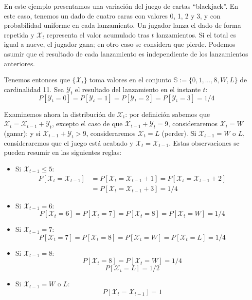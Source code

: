 \begin{exampleth}
En este ejemplo presentamos una variación del juego de cartas \enquote{blackjack}. En este caso, tenemos un dado de cuatro caras con valores 0, 1, 2 y 3, y con probabilidad uniforme en cada lanzamiento. Un jugador lanza el dado de forma repetida y $\mathcal{X}_t$ representa el valor acumulado tras $t$ lanzamientos. Si el total es igual a nueve, el jugador gana; en otro caso se considera que pierde. Podemos asumir que el resultado de cada lanzamiento es independiente de los lanzamientos anteriores.

Tenemos entonces que $\{\mathcal{X}_t\}$ toma valores en el conjunto $\mathbb{S}:=\{0,1,...,8,W,L\}$ de cardinalidad 11. Sea $\mathcal{Y}_t$ el resultado del lanzamiento en el instante $t$:
\[
P[\mathcal{Y}_t=0]=P[\mathcal{Y}_t=1]=P[\mathcal{Y}_t=2]=P[\mathcal{Y}_t=3]=1/4
\]

Examinemos ahora la distribución de $\mathcal{X}_t$: por definición sabemos que $\mathcal{X}_t=\mathcal{X}_{t-1}+\mathcal{Y}_t$, excepto el caso de que $\mathcal{X}_{t-1}+\mathcal{Y}_t=9$, consideraremos $\mathcal{X}_t=W$ (ganar); y si $\mathcal{X}_{t-1}+\mathcal{Y}_t>9$, consideraremos $\mathcal{X}_t=L$ (perder). Si $\mathcal{X}_{t-1}=W$ o $L$, consideraremos que el juego está acabado y $\mathcal{X}_t=\mathcal{X}_{t-1}$. Estas observaciones se pueden resumir en las siguientes reglas:

\begin{itemize}
    \item Si $\mathcal{X}_{t-1}\leq5$:
    \[\begin{aligned}
        P[\mathcal{X}_t=\mathcal{X}_{t-1}]&=P[\mathcal{X}_t=\mathcal{X}_{t-1}+1]
        =P[\mathcal{X}_t=\mathcal{X}_{t-1}+2]\\&=P[\mathcal{X}_t=\mathcal{X}_{t-1}+3]=1/4
    \end{aligned}
    \]
    \item Si $\mathcal{X}_{t-1}=6$:
    \[
    P[\mathcal{X}_t=6]=P[\mathcal{X}_t=7]=P[\mathcal{X}_t=8]=P[\mathcal{X}_t=W]=1/4
    \]
    \item Si $\mathcal{X}_{t-1}=7$:
    \[
    P[\mathcal{X}_t=7]=P[\mathcal{X}_t=8]=P[\mathcal{X}_t=W]=P[\mathcal{X}_t=L]=1/4
    \]
    \item Si $\mathcal{X}_{t-1}=8$:
    \[
        P[\mathcal{X}_t=8]=P[\mathcal{X}_t=W]=1/4
    \]\[
        P[\mathcal{X}_t=L]=1/2
    \]
    \item Si $\mathcal{X}_{t-1}=W$ o $L$:
    \[
        P[\mathcal{X}_t=\mathcal{X}_{t-1}]=1
    \]
\end{itemize}


\end{exampleth}

